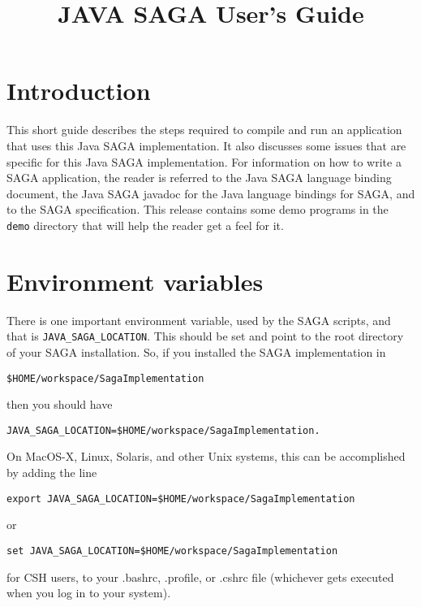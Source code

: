 \documentclass[a4paper,10pt]{article}
\begin{document}
\title{JAVA SAGA User's Guide}

\maketitle

\section{Introduction}

This short guide describes the steps required to compile
and run an application that uses this Java SAGA implementation.
It also discusses some issues that are specific for this
Java SAGA implementation.
For information on how to write a SAGA application, the reader is referred
to the Java SAGA language binding document, the Java SAGA javadoc for the
Java language bindings for SAGA, and to the SAGA specification.
This release contains some demo programs in the \texttt{demo}
directory that will help the reader get a feel for it.

\section{Environment variables}

There is one important environment variable, used by the SAGA scripts,
and that is \texttt{JAVA\_SAGA\_LOCATION}.
This should be set and point to the root
directory of your SAGA installation. So, if you installed the SAGA
implementation in 

\noindent
{\small
\begin{verbatim}
$HOME/workspace/SagaImplementation
\end{verbatim}
}
\noindent

then you should have

\noindent
{\small
\begin{verbatim}
JAVA_SAGA_LOCATION=$HOME/workspace/SagaImplementation.
\end{verbatim}
}
\noindent

On MacOS-X, Linux, Solaris, and other Unix systems, this can be accomplished
by adding the line
\noindent
{\small
\begin{verbatim}
export JAVA_SAGA_LOCATION=$HOME/workspace/SagaImplementation
\end{verbatim}
}
\noindent
or
\noindent
{\small
\begin{verbatim}
set JAVA_SAGA_LOCATION=$HOME/workspace/SagaImplementation
\end{verbatim}
}
\noindent
for CSH users, to your .bashrc, .profile, or .cshrc file (whichever gets
executed when you log in to your system).
\end{document}
